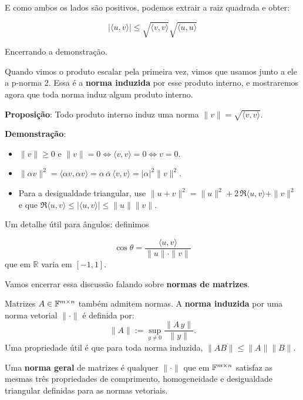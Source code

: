 \documentclass[11pt, a4paper]{article}
\begin{document}
\void[-0.5]

E como ambos os lados são positivos, podemos extrair a raiz quadrada e obter:

\void[-1]

\[|\langle u,v\rangle| \leq \sqrt{\langle v,v \rangle} \sqrt{\langle u,u \rangle}\]

\void[-0.6]

Encerrando a demonstração.

Quando vimos o produto escalar pela primeira vez, vimos que usamos junto a ele a p-norma 2. Essa é a \textbf{norma induzida} por esse produto interno, e mostraremos agora que toda norma induz algum produto interno.

\textbf{Proposição}: Todo produto interno induz uma norma \(\displaystyle\|v\|=\sqrt{\langle v,v\rangle}\).

\textbf{Demonstração}:

\begin{itemize}
  \item \(\|v\|\ge0\) e \(\|v\|=0\iff\langle v,v\rangle=0\iff v=0\).
  \item \(\|\alpha v\|^2 = \langle \alpha v,\alpha v\rangle = \alpha\,\overline{\alpha}\,\langle v,v\rangle = |\alpha|^2\|v\|^2\).
  \item Para a desigualdade triangular, use
  \(\|u+v\|^2 = \|u\|^2 + 2\,\Re\langle u,v\rangle + \|v\|^2\)
  e que \(\Re\langle u,v\rangle\le|\langle u,v\rangle|\le\|u\|\|v\|\).
\end{itemize}

Um detalhe útil para ângulos: definimos

\void[-1.3]

\[
\cos\theta = \frac{\langle u,v\rangle}{\|u\|\cdot\|v\|}
\]
que em \(\mathbb{R}\) varia em \([-1,1]\).

\void[1.2]

Vamos encerrar essa discussão falando sobre \textbf{normas de matrizes}.

Matrizes \(A\in \mathbb{F}^{m\times n}\) também admitem normas. A \textbf{norma induzida} por uma norma vetorial \(\|\cdot\|\) é definida por:
\[
\|A\| := \sup_{y\neq0}\frac{\|A\,y\|}{\|y\|}.
\]
Uma propriedade útil é que para toda norma induzida, \(\|AB\|\le\|A\|\|B\|\).

\void[1]

Uma \textbf{norma geral} de matrizes é qualquer \(\|\cdot\|\) que em \(\mathbb{F}^{m\times n}\) satisfaz as mesmas três propriedades de comprimento, homogeneidade e desigualdade triangular definidas para as normas vetoriais.
\end{document}
